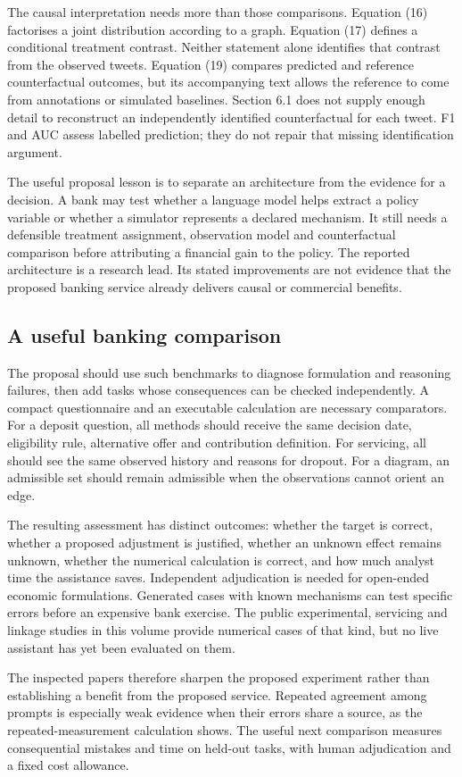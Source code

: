 The causal interpretation needs more than those comparisons. Equation (16)
factorises a joint distribution according to a graph. Equation (17) defines
a conditional treatment contrast. Neither statement alone identifies that
contrast from the observed tweets. Equation (19) compares predicted and
reference counterfactual outcomes, but its accompanying text allows the
reference to come from annotations or simulated baselines. Section 6.1 does
not supply enough detail to reconstruct an independently identified
counterfactual for each tweet. F1 and AUC assess labelled prediction; they
do not repair that missing identification argument.

The useful proposal lesson is to separate an architecture from the evidence
for a decision. A bank may test whether a language model helps extract a
policy variable or whether a simulator represents a declared mechanism.
It still needs a defensible treatment assignment, observation model and
counterfactual comparison before attributing a financial gain to the policy.
The reported architecture is a research lead. Its stated improvements are
not evidence that the proposed banking service already delivers causal or
commercial benefits.

\subsection{A useful banking comparison}
The proposal should use such benchmarks to diagnose formulation and reasoning
failures, then add tasks whose consequences can be checked independently.
A compact questionnaire and an executable calculation are necessary
comparators. For a deposit question, all methods should receive the same
decision date, eligibility rule, alternative offer and contribution definition.
For servicing, all should see the same observed history and reasons for
dropout. For a diagram, an admissible set should remain admissible when the
observations cannot orient an edge.

The resulting assessment has distinct outcomes: whether the target is correct,
whether a proposed adjustment is justified, whether an unknown effect remains
unknown, whether the numerical calculation is correct, and how much analyst
time the assistance saves. Independent adjudication is needed for open-ended
economic formulations. Generated cases with known mechanisms can test
specific errors before an expensive bank exercise. The public experimental,
servicing and linkage studies in this volume provide numerical cases of that
kind, but no live assistant has yet been evaluated on them.

The inspected papers therefore sharpen the proposed experiment rather
than establishing a benefit from the proposed service. Repeated agreement
among prompts is especially weak evidence when their errors share a source,
as the repeated-measurement calculation shows. The useful next comparison
measures consequential mistakes and time on held-out tasks, with human
adjudication and a fixed cost allowance.
